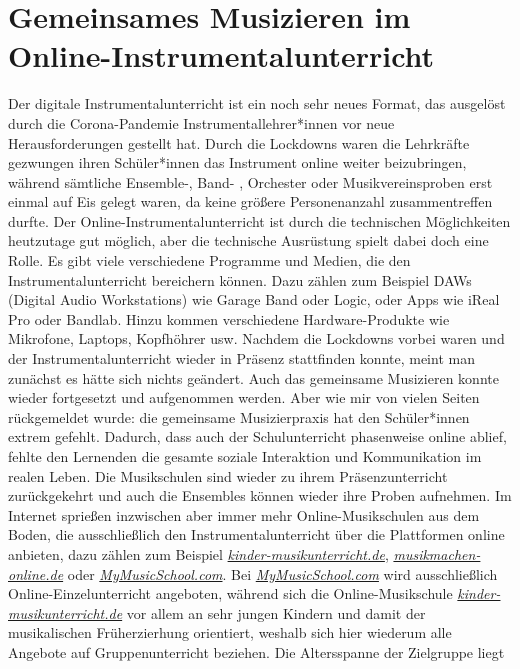 \section{Gemeinsames Musizieren im Online-Instrumentalunterricht}

Der digitale Instrumentalunterricht ist ein noch sehr neues Format, das
ausgelöst durch die Corona-Pandemie Instrumentallehrer*innen
vor neue Herausforderungen gestellt hat. Durch die Lockdowns waren die
Lehrkräfte gezwungen ihren Schüler*innen das Instrument online weiter
beizubringen, während sämtliche Ensemble-, Band- , Orchester oder
Musikvereinsproben erst einmal auf Eis gelegt waren, da keine größere
Personenanzahl zusammentreffen durfte. Der Online-Instrumentalunterricht ist
durch die technischen Möglichkeiten heutzutage gut möglich, aber die technische
Ausrüstung spielt dabei doch eine Rolle. Es gibt viele verschiedene Programme
und Medien, die den Instrumentalunterricht bereichern können. Dazu zählen zum
Beispiel DAWs (Digital Audio Workstations) wie Garage Band oder Logic, oder Apps
wie iReal Pro oder Bandlab. Hinzu kommen verschiedene
Hardware-Produkte wie Mikrofone, Laptops, Kopfhöhrer usw. Nachdem
die Lockdowns vorbei waren und der Instrumentalunterricht wieder in
Präsenz stattfinden konnte, meint man zunächst es hätte sich nichts geändert.
Auch das gemeinsame Musizieren konnte wieder fortgesetzt und aufgenommen werden.
Aber wie mir von vielen Seiten rückgemeldet wurde: die gemeinsame Musizierpraxis
hat den Schüler*innen extrem gefehlt. Dadurch, dass auch der Schulunterricht
phasenweise online ablief, fehlte den Lernenden die gesamte soziale Interaktion
und Kommunikation im realen Leben. Die Musikschulen sind wieder zu ihrem
Präsenzunterricht zurückgekehrt und auch die Ensembles können wieder ihre Proben
aufnehmen. Im Internet sprießen inzwischen aber immer mehr Online-Musikschulen
aus dem Boden, die ausschließlich den Instrumentalunterricht über die
Plattformen online anbieten, dazu zählen zum Beispiel
\emph{\href{https://www.kinder-musikunterricht.de/}{kinder-musikunterricht.de}}, \emph{\href{https://musikmachen-online.de/}{musikmachen-online.de}} oder
\emph{\href{https://mymusicschool.com/}{MyMusicSchool.com}}. Bei \emph{\href{https://mymusicschool.com/}{MyMusicSchool.com}} wird ausschließlich
Online-Einzelunterricht angeboten, während sich die Online-Musikschule
\emph{\href{https://www.kinder-musikunterricht.de/}{kinder-musikunterricht.de}} vor allem an sehr jungen Kindern und damit der
musikalischen Früherzierhung orientiert, weshalb sich hier wiederum alle
Angebote auf Gruppenunterricht beziehen. Die Altersspanne der Zielgruppe liegt
